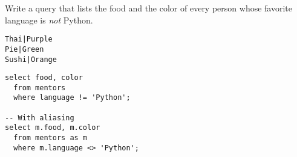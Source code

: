 \begin{blocksection}
\question Write a query that lists the food and the color of every person whose
favorite language is \emph{not} Python.

\begin{lstlisting}
Thai|Purple
Pie|Green
Sushi|Orange
\end{lstlisting}

\begin{solution}[1in]
\begin{lstlisting}
select food, color
  from mentors
  where language != 'Python';
  
-- With aliasing
select m.food, m.color
  from mentors as m
  where m.language <> 'Python';
\end{lstlisting}
\end{solution}
\end{blocksection}
